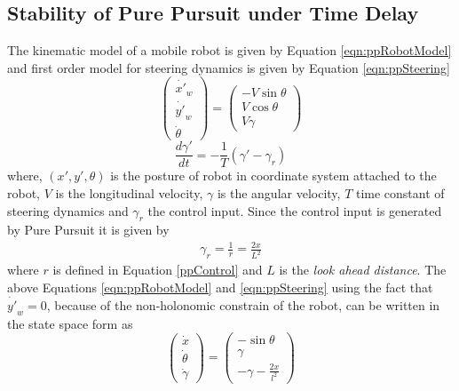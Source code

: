 \chapter[ ]{}
\label{appendix_b}
\section{Stability of Pure Pursuit under Time Delay}
\label{app:ollero}
The kinematic model of a mobile robot is given by Equation \ref{eqn:ppRobotModel}  and first order model for steering dynamics is given by Equation \ref{eqn:ppSteering} 
\begin{equation}
\label{eqn:ppRobotModel}
\begin{pmatrix}
\dot{x'}_w\\ \dot{y'}_w\\ \dot{\theta}
\end{pmatrix}
=
\begin{pmatrix}
-V \sin\theta\\ V\cos\theta\\V\gamma
\end{pmatrix}
\end{equation}
\begin{equation}
\label{eqn:ppSteering}
\frac{d\gamma'}{dt}=-\frac{1}{T}(\gamma'-\gamma_r)
\end{equation}
where, $(x',y',\theta)$ is the posture of robot in coordinate system attached to the robot,  $V$  is the longitudinal velocity,  $\gamma$ is the angular velocity, $T$ time constant of steering dynamics and $\gamma_r$ the control input.  Since the control input is generated by Pure Pursuit it is given by
\begin{eqnarray}
\gamma_r=\frac{1}{r}=\frac{2x}{L^2}
\end{eqnarray} 
where $r$ is defined in Equation \ref{ppControl} and $L$ is the \textit{look ahead distance}. The above Equations \ref{eqn:ppRobotModel} and \ref{eqn:ppSteering}  using the fact that $\dot{y'}_w=0$, because of the non-holonomic constrain of the robot, can be written  in the  state space  form  as 
\begin{equation}
\begin{pmatrix}
\dot{x}\\\dot{\theta}\\\dot{\gamma}
\end{pmatrix}
=
\begin{pmatrix}
-\sin\theta\\ \gamma \\ -\gamma -\frac{2x}{l^2}
\end{pmatrix}
\end{equation}
